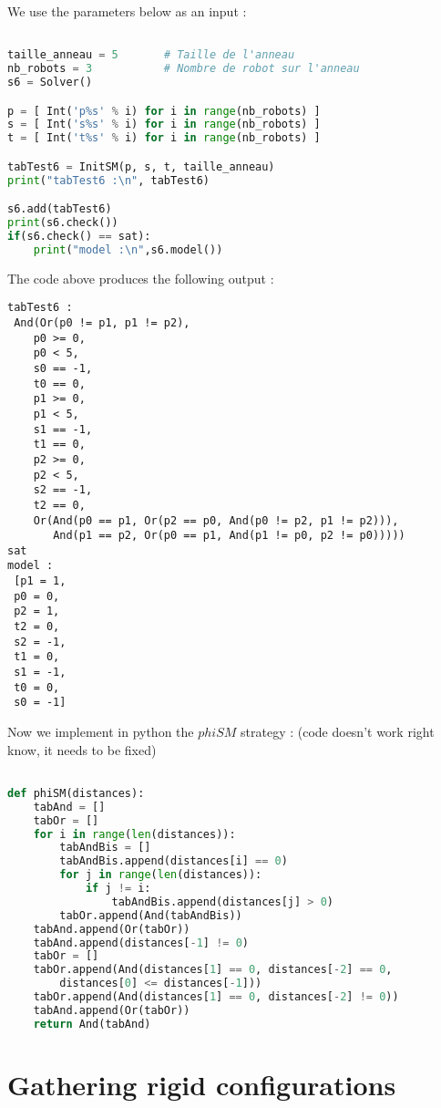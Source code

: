 \documentclass{article}
\begin{document}
We use the parameters below as an input :
\begin{lstlisting}[language=Python]

taille_anneau = 5       # Taille de l'anneau 
nb_robots = 3           # Nombre de robot sur l'anneau
s6 = Solver()

p = [ Int('p%s' % i) for i in range(nb_robots) ]
s = [ Int('s%s' % i) for i in range(nb_robots) ]
t = [ Int('t%s' % i) for i in range(nb_robots) ]

tabTest6 = InitSM(p, s, t, taille_anneau)
print("tabTest6 :\n", tabTest6)

s6.add(tabTest6)
print(s6.check())
if(s6.check() == sat):
    print("model :\n",s6.model())
\end{lstlisting}
The code above produces the following output : 
\begin{lstlisting}
tabTest6 :
 And(Or(p0 != p1, p1 != p2),
    p0 >= 0,
    p0 < 5,
    s0 == -1,
    t0 == 0,
    p1 >= 0,
    p1 < 5,
    s1 == -1,
    t1 == 0,
    p2 >= 0,
    p2 < 5,
    s2 == -1,
    t2 == 0,
    Or(And(p0 == p1, Or(p2 == p0, And(p0 != p2, p1 != p2))),
       And(p1 == p2, Or(p0 == p1, And(p1 != p0, p2 != p0)))))
sat
model :
 [p1 = 1,
 p0 = 0,
 p2 = 1,
 t2 = 0,
 s2 = -1,
 t1 = 0,
 s1 = -1,
 t0 = 0,
 s0 = -1]
\end{lstlisting}

Now we implement in python the $phiSM$ strategy : (code doesn't work right know, it needs to be fixed)

\begin{lstlisting}[language=Python]

def phiSM(distances):
    tabAnd = []
    tabOr = []
    for i in range(len(distances)):
        tabAndBis = []
        tabAndBis.append(distances[i] == 0)
        for j in range(len(distances)):
            if j != i:
                tabAndBis.append(distances[j] > 0)
        tabOr.append(And(tabAndBis))
    tabAnd.append(Or(tabOr))
    tabAnd.append(distances[-1] != 0)
    tabOr = []
    tabOr.append(And(distances[1] == 0, distances[-2] == 0,
        distances[0] <= distances[-1]))
    tabOr.append(And(distances[1] == 0, distances[-2] != 0))
    tabAnd.append(Or(tabOr))
    return And(tabAnd)
\end{lstlisting}

\section{Gathering rigid configurations}
\end{document}
